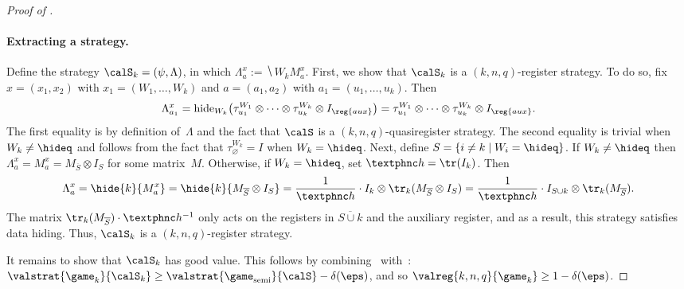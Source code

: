 \begin{proof}[Proof of ]
\paragraph{Extracting a strategy.}
Define the strategy $\calS_k = (\psi, \Lambda)$, in which
$\Lambda_a^x := \hide{W_k}{M^x_a}$.
First, we show that $\calS_k$ is a $(k, n, q)$-register strategy.
To do so, fix $x= (x_1, x_2)$ with $x_1 = (W_1, \ldots, W_k)$ and $a = (a_1, a_2)$ with $a_1 = (u_1, \ldots, u_k)$.
Then
\begin{equation*}
\Lambda_{a_1}^x
= \mathrm{hide}_{W_k}\big(\tau^{W_1}_{u_1} \otimes \cdots \otimes \tau^{W_k}_{u_k} \otimes I_{\reg{aux}}\big)\\
	= \tau^{W_1}_{u_1} \otimes \cdots \otimes \tau^{W_k}_{u_k} \otimes I_{\reg{aux}}.
\end{equation*}
The first equality is by definition of~$\Lambda$ and the fact that $\calS$ is a $(k, n, q)$-quasiregister strategy.
The second equality is trivial when $W_k \neq \hideq$ and follows from the fact that $\tau^{W_k}_{\varnothing} = I$ when $W_k = \hideq$.
Next, define $S = \{i\neq k  \mid W_i = \hideq\}$.
If $W_k \neq \hideq$ then $\Lambda_a^x = M^x_a = M_{\overline{S}} \otimes I_S$ for some matrix~$M$.
Otherwise, if $W_k = \hideq$, set $\phoenicianindahizzous = \tr(I_k)$. Then
\begin{equation*}
\Lambda_a^x = \hide{k}{M^x_a} = \hide{k}{M_{\overline{S}} \otimes I_S}
= \frac{1}{\phoenicianindahizzous} \cdot I_k \otimes \tr_k(M_{\overline{S}} \otimes I_S)
= \frac{1}{\phoenicianindahizzous} \cdot I_{S \cup k} \otimes \tr_k(M_{\overline{S}}).
\end{equation*}
The matrix $\tr_k(M_{\overline{S}}) \cdot \phoenicianindahizzous^{-1}$
only acts on the registers in $\overline{S \cup k}$ and the auxiliary register,
and as a result, this strategy satisfies data hiding.
Thus, $\calS_k$ is a $(k, n, q)$-register strategy.

It remains to show that $\calS_k$ has good value.
This follows by combining~ with~:
$\valstrat{\game_{k}}{\calS_{k}} \geq \valstrat{\game_{\mathrm{semi}}}{\calS} - \delta(\eps)$,
and so $\valreg{k,n,q}{\game_{k}} \geq 1 - \delta(\eps)$.
\end{proof}




